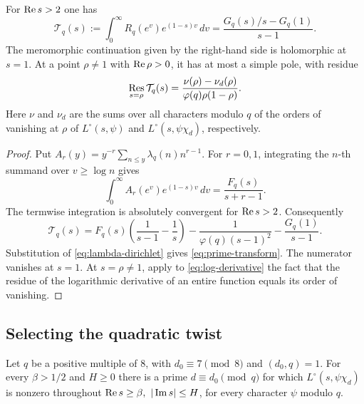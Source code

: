\begin{lemma}\label{lem:prime-transform}
For \(\operatorname{Re} s>2\) one has
\begin{equation}\label{eq:prime-transform}
  \mathcal T_q(s):=\int_0^\infty R_q(e^v)e^{(1-s)v}\,dv
     =\frac{G_q(s)/s-G_q(1)}{s-1}.
\end{equation}
The meromorphic continuation given by the right-hand side is holomorphic at \(s=1\).
At a point \(\rho\ne1\) with \(\operatorname{Re}\rho>0\), it has at most a simple pole, with residue
\[
  \operatorname*{Res}_{s=\rho}\mathcal T_q(s)=
    \frac{\nu(\rho)-\nu_d(\rho)}{\varphi(q)\rho(1-\rho)}.
\]
Here \(\nu\) and \(\nu_d\) are the sums over all characters modulo \(q\) of the
orders of vanishing at \(\rho\) of \(L^\circ(s,\psi)\) and \(L^\circ(s,\psi\chi_d)\),
respectively.
\end{lemma}

\begin{proof}
Put \(A_r(y)=y^{-r}\sum_{n\le y}\lambda_q(n)n^{r-1}\).
For \(r=0,1\), integrating the \(n\)-th summand over \(v\ge\log n\) gives
\[
 \int_0^\infty A_r(e^v)e^{(1-s)v}\,dv=\frac{F_q(s)}{s+r-1}.
\]
The termwise integration is absolutely convergent for \(\operatorname{Re} s>2\). Consequently
\[
 \mathcal T_q(s)
 = F_q(s)\left(\frac1{s-1}-\frac1s\right)
    -\frac1{\varphi(q)(s-1)^2}-\frac{G_q(1)}{s-1}.
\]
Substitution of \eqref{eq:lambda-dirichlet} gives \eqref{eq:prime-transform}.
The numerator vanishes at \(s=1\). At \(s=\rho\ne1\), apply to
\eqref{eq:log-derivative} the fact that the residue of the logarithmic derivative
of an entire function equals its order of vanishing.
\end{proof}

\subsection{Selecting the quadratic twist}

\begin{lemma}\label{lem:select-quadratic}
Let \(q\) be a positive multiple of \(8\), with \(d_0\equiv7\pmod8\) and \((d_0,q)=1\).
For every \(\beta>1/2\) and \(H\ge0\) there is a prime \(d\equiv d_0\pmod q\)
for which \(L^\circ(s,\psi\chi_d)\) is nonzero throughout
\(\RePart s\ge\beta,\ |\ImPart s|\le H\), for every character \(\psi\) modulo \(q\).
\end{lemma}

